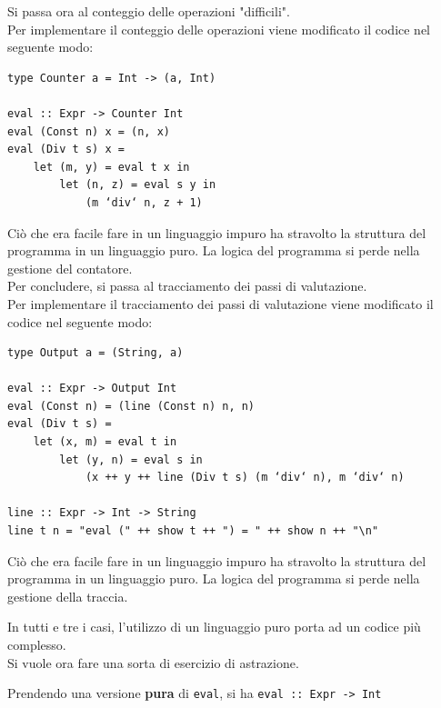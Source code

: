 \documentclass{article}
\begin{document}
Si passa ora al conteggio delle operazioni "difficili".\\
Per implementare il conteggio delle operazioni viene modificato il codice nel seguente modo:
\begin{tcolorbox}
\begin{verbatim}
type Counter a = Int -> (a, Int)

eval :: Expr -> Counter Int
eval (Const n) x = (n, x)
eval (Div t s) x =
    let (m, y) = eval t x in
        let (n, z) = eval s y in
            (m ‘div‘ n, z + 1)
\end{verbatim}
\end{tcolorbox}
Ciò che era facile fare in un linguaggio impuro ha stravolto la struttura del programma in un linguaggio puro. La logica del programma si perde nella gestione del contatore.\vspace{14pt}\\
Per concludere, si passa al tracciamento dei passi di valutazione.\\
Per implementare il tracciamento dei passi di valutazione viene modificato il codice nel seguente modo:
\begin{tcolorbox}
\begin{verbatim}
type Output a = (String, a)

eval :: Expr -> Output Int
eval (Const n) = (line (Const n) n, n)
eval (Div t s) =
    let (x, m) = eval t in
        let (y, n) = eval s in
            (x ++ y ++ line (Div t s) (m ‘div‘ n), m ‘div‘ n)

line :: Expr -> Int -> String
line t n = "eval (" ++ show t ++ ") = " ++ show n ++ "\n"
\end{verbatim}
\end{tcolorbox}
Ciò che era facile fare in un linguaggio impuro ha stravolto la struttura del programma in un linguaggio puro. La logica del programma si perde nella gestione della traccia.

In tutti e tre i casi, l'utilizzo di un linguaggio puro porta ad un codice più complesso.\vspace{14pt}\\
Si vuole ora fare una sorta di esercizio di astrazione.

Prendendo una versione \textbf{pura} di \texttt{eval}, si ha \texttt{\quad eval :: Expr -> Int}
\end{document}
